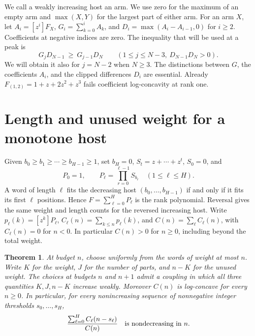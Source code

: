 \documentclass[11pt]{article}
\newtheorem{theorem}{Theorem}[section]
\begin{document}
We call a weakly increasing host an arm. We use zero for the maximum
of an empty arm and \(\max(X,Y)\) for the largest part of either arm.
For an arm \(X\), let
\(A_i=[z^i]F_X\), \(G_i=\sum_{k=0}^i A_k\), and
\(D_i=\max(A_i-A_{i-1},0)\) for \(i\ge2\). Coefficients at negative indices
are zero. The inequality that will be used at a peak is
\begin{equation}
            G_jD_{N-1}\ \ge\ G_{j-1}D_N
            \qquad (1\le j\le N-3,\ D_{N-1}D_N>0).              \label{eq:bridge}
\end{equation}
We will obtain it also for \(j=N-2\) when \(N\ge3\).
The distinctions between \(G\), the coefficients \(A_i\), and the clipped
differences \(D_i\) are essential. Already \(F_{(1,2)}=1+z+2z^2+z^3\) fails coefficient
log-concavity at rank one.

\section{Length and unused weight for a monotone host}
Given \(b_0\ge b_1\ge\cdots\ge b_{H-1}\ge1\), set \(b_H=0\),
\(S_t=z+\cdots+z^t\), \(S_0=0\), and
\[
 P_0=1,\qquad P_\ell=\prod_{r=0}^{\ell-1}S_{b_r}\quad(1\le\ell\le H).
\]
A word of length \(\ell\) fits the decreasing host \((b_0,\ldots,b_{H-1})\)
if and only if it fits its first \(\ell\) positions. Hence
\(F=\sum_{\ell=0}^H P_\ell\) is the rank polynomial. Reversal gives the
same weight and length counts for the reversed increasing host. Write
\(p_\ell(k)=[z^k]P_\ell\),
\(C_\ell(n)=\sum_{k\le n}p_\ell(k)\), and
\(C(n)=\sum_\ell C_\ell(n)\), with \(C_\ell(n)=0\) for \(n<0\).
In particular \(C(n)>0\) for \(n\ge0\), including beyond the total weight.

\begin{theorem}\label{thm:coupling}
At budget \(n\), choose uniformly from the words of weight at most \(n\).
Write \(K\) for the weight, \(J\) for the number of parts, and \(n-K\)
for the unused weight. The choices at budgets \(n\) and \(n+1\) admit
a coupling in which all three quantities \(K,J,n-K\) increase weakly.
Moreover \(C(n)\) is log-concave for every \(n\ge0\). In particular,
for every nonincreasing sequence of nonnegative integer thresholds
\(s_0,\ldots,s_H\),
\begin{equation}
          \frac{\sum_{\ell=0}^{H}C_\ell(n-s_\ell)}{C(n)}
          \quad\hbox{is nondecreasing in }n.                       \label{eq:threshold}
\end{equation}
\end{theorem}
\end{document}
